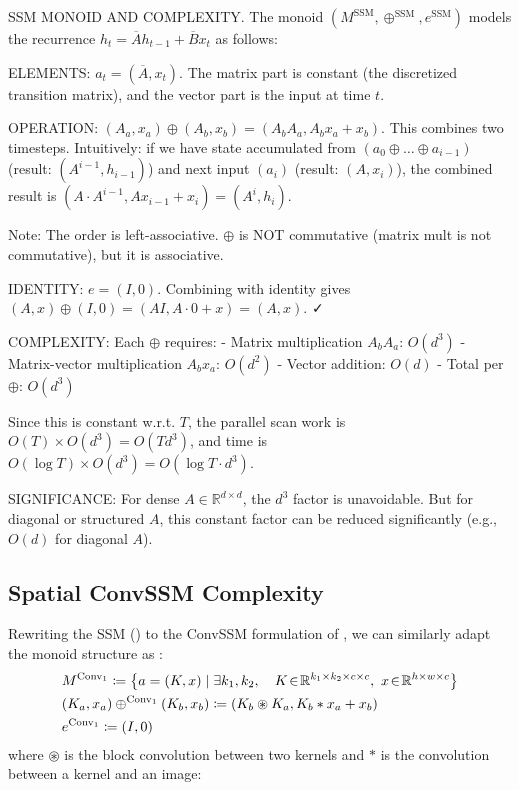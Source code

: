 \documentclass{article}
\begin{document}
\begin{thomasbox}
SSM MONOID AND COMPLEXITY. The monoid $(M^{\mathrm{SSM}}, \oplus^{\mathrm{SSM}}, e^{\mathrm{SSM}})$ models the recurrence $h_t = \overline{A} h_{t-1} + \overline{B} x_t$ as follows:

ELEMENTS: $a_t = (\overline{A}, x_t)$. The matrix part is constant (the discretized transition matrix), and the vector part is the input at time $t$.

OPERATION: $(A_a, x_a) \oplus (A_b, x_b) = (A_b A_a, A_b x_a + x_b)$. This combines two timesteps. Intuitively: if we have state accumulated from $(a_0 \oplus \ldots \oplus a_{i-1})$ (result: $(A^{i-1}, h_{i-1})$) and next input $(a_i)$ (result: $(A, x_i)$), the combined result is $(A \cdot A^{i-1}, A x_{i-1} + x_i) = (A^i, h_i)$.

Note: The order is left-associative. $\oplus$ is NOT commutative (matrix mult is not commutative), but it is associative.

IDENTITY: $e = (I, 0)$. Combining with identity gives $(A, x) \oplus (I, 0) = (A I, A \cdot 0 + x) = (A, x)$. ✓

COMPLEXITY: Each $\oplus$ requires:
- Matrix multiplication $A_b A_a$: $O(d^3)$
- Matrix-vector multiplication $A_b x_a$: $O(d^2)$
- Vector addition: $O(d)$
- Total per $\oplus$: $O(d^3)$

Since this is constant w.r.t. $T$, the parallel scan work is $O(T) \times O(d^3) = O(Td^3)$, and time is $O(\log T) \times O(d^3) = O(\log T \cdot d^3)$.

SIGNIFICANCE: For dense $A \in \mathbb{R}^{d \times d}$, the $d^3$ factor is unavoidable. But for diagonal or structured $A$, this constant factor can be reduced significantly (e.g., $O(d)$ for diagonal $A$).
\end{thomasbox}

\subsection{Spatial ConvSSM Complexity}
\label{app:Spatial_ConvSSM_complexity}

Rewriting the SSM () to the ConvSSM formulation of , we can similarly adapt the monoid structure as :
\begin{align}
    &M^{\mathrm{Conv}_1}\coloneqq \left\{a = (K, x)\mid \exists k_1, k_2,\quad K\!\in\!\mathbb{R}^{k_1\times k_2\times c\times c},~x\!\in\!\mathbb{R}^{h \times w \times c}\right\}\\
    &(K_a, x_a) \oplus^{\mathrm{Conv}_1} (K_b,x_b)\coloneqq (K_b \circledast K_a, K_b \ast x_a + x_b)\\
    &e^{\mathrm{Conv}_1}\coloneqq(I, 0)
\end{align}
\noindent where $\circledast$ is the block convolution between two kernels and $\ast$ is the convolution between a kernel and an image:
\end{document}

